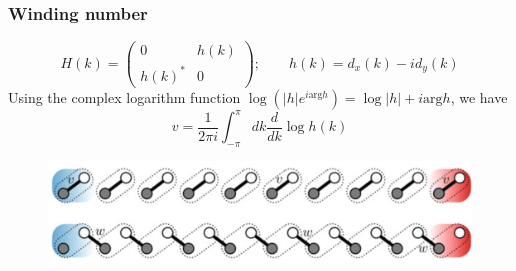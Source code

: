 \documentclass{beamer}
\begin{document}
\begin{frame}
\frametitle{Winding number}
\begin{equation}
H(k)=
\left(\begin{array}{cc}
0&h(k)\\
h(k)^*&0
\end{array}\right);\qquad h(k)=d_x(k)-id_y(k)
\end{equation}
Using the complex logarithm function $\log(|h|e^{i\textrm{arg}h})=\log|h|+i\textrm{arg}h$, we have
\begin{equation}
v=\frac{1}{2\pi i}\int_{-\pi}^{\pi}dk\frac{d}{dk}\log h(k)
\end{equation}
\begin{figure}
	\includegraphics[scale=0.5]{figure/ssh2.png}
\end{figure}
\end{frame}

\end{document}
